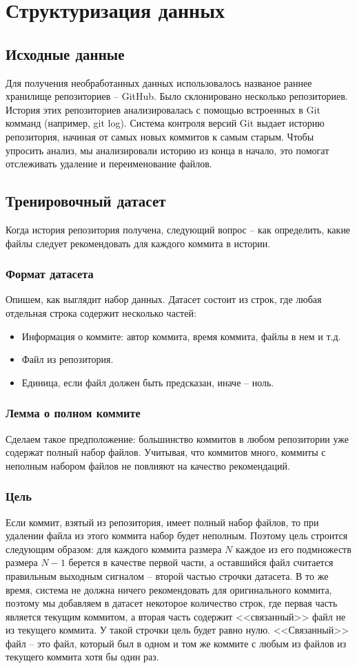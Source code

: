 \documentclass[times]{itmo-student-thesis}
\begin{document}
\section{Структуризация данных}
\subsection{Исходные данные}
Для получения необработанных данных использовалось названое раннее хранилище репозиториев -- GitHub. Было склонировано несколько репозиториев. История этих репозиториев анализировалась с помощью встроенных в Git комманд (например, git log). Система контроля версий Git выдает историю репозитория, начиная от самых новых коммитов к самым старым. Чтобы упросить анализ, мы анализировали историю из конца в начало, это помогат отслеживать удаление и переименование файлов.
\subsection{Тренировочный датасет}
Когда история репозитория получена, следующий вопрос -- как определить, какие файлы следует рекомендовать для каждого коммита в истории.
\subsubsection{Формат датасета}
Опишем, как выглядит набор данных. Датасет состоит из строк, где любая отдельная строка содержит несколько частей:
    \begin{itemize}
		\item Информация о коммите: автор коммита, время коммита, файлы в нем и т.д.
		\item Файл из репозитория.
		\item Единица, если файл должен быть предсказан, иначе -- ноль.
	\end{itemize}
\subsubsection{Лемма о полном коммите}
Сделаем такое предположение: большинство коммитов в любом репозитории уже содержат полный набор файлов. Учитывая, что коммитов много, коммиты с неполным набором файлов не повлияют на качество рекомендаций.
\subsubsection{Цель}
Если коммит, взятый из репозитория, имеет полный набор файлов, то при удалении файла из этого коммита набор будет неполным. Поэтому цель строится следующим образом: для каждого коммита размера $N$ каждое из его подмножеств размера $N - 1$ берется в качестве первой части, а оставшийся файл считается правильным выходным сигналом -- второй частью строчки датасета. В то же время, система не должна ничего рекомендовать для оригинального коммита, поэтому мы добавляем в датасет некоторое количество строк, где первая часть является текущим коммитом, а вторая часть содержит <<связанный>> файл не из текущего коммита. У такой строчки цель будет равно нулю. <<Связанный>> файл -- это файл, который был в одном и том же коммите с любым из файлов из текущего коммита хотя бы один раз.
\end{document}
